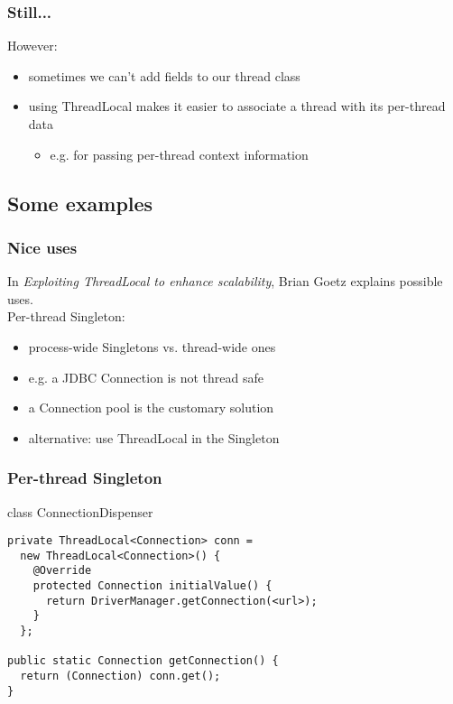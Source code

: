 \documentclass{beamer}
\begin{document}
\begin{frame}
  \frametitle{Still...}

However:
\begin{itemize}
\item sometimes we can't add fields to our thread class
\pause
\item using ThreadLocal makes it easier to associate a thread with its per-thread data
\begin{itemize}
\item e.g. for passing per-thread context information
\end{itemize}

\end{itemize}

\end{frame}

\subsection{Some examples}

\begin{frame}
  \frametitle{Nice uses}

In \textit{Exploiting ThreadLocal to enhance scalability}, Brian Goetz explains
possible uses.\\
\vspace*{0.5cm}
Per-thread Singleton:
\begin{itemize}
\item process-wide Singletons vs. thread-wide ones
\item e.g. a JDBC Connection is not thread safe
\item a Connection pool is the customary solution
\item alternative: use ThreadLocal in the Singleton
\end{itemize}

\end{frame}

\begin{frame}[fragile]
  \frametitle{Per-thread Singleton}

\begin{block}{class ConnectionDispenser}
\begin{verbatim}
private ThreadLocal<Connection> conn =
  new ThreadLocal<Connection>() {
    @Override
    protected Connection initialValue() {
      return DriverManager.getConnection(<url>);
    }
  };

public static Connection getConnection() {
  return (Connection) conn.get();
}
\end{verbatim}
\end{block}

\end{frame}
\end{document}

